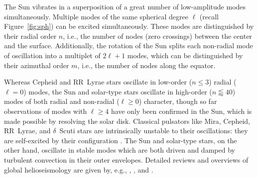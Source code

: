 The Sun vibrates in a superposition of a great number of low-amplitude modes simultaneously. 
Multiple modes of the same spherical degree $\ell$ (recall Figure~\ref{fig:sph}) can be excited simultaneously. 
These modes are distinguished by their radial order $n$, i.e., the number of nodes (zero crossings) between the center and the surface. 
Additionally, the rotation of the Sun splits each non-radial mode of oscillation into a multiplet of ${2\ell+1}$ modes, which can be distinguished by their azimuthal order $m$, i.e., the number of nodes along the equator. 

Whereas Cepheid and RR~Lyrae stars oscillate in low-order (${n\leq 3}$) radial (${\ell = 0}$) modes, the Sun and solar-type stars oscillate in high-order (${n\lessapprox 40}$) modes of both radial and non-radial (${\ell\geq 0}$) character, though so far observations of modes with $\ell \geq 4$ have only been confirmed in the Sun, which is made possible by resolving the solar disk. 
Classical pulsators like Mira, Cepheid, RR~Lyrae, and $\delta$~Scuti stars are intrinsically unstable to their oscillations: they are self-excited by their configuration \citep[e.g.,][]{2015EAS....73..111S}. 
The Sun and solar-type stars, on the other hand, oscillate in stable modes which are both driven and damped by turbulent convection in their outer envelopes. 
Detailed reviews and overviews of global helioseismology are given by, e.g., \citet{2002RvMP...74.1073C}, \citet{Kosovichev1999,2011lnp...832....3k}, and \citet{2016lrsp...13....2b}. 

